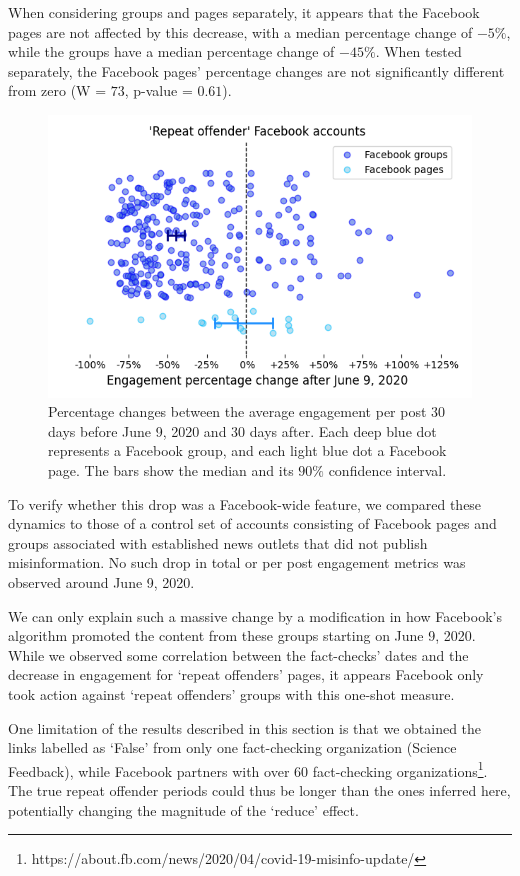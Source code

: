 \documentclass[11pt,a4paper]{article}
\begin{document}
When considering groups and pages separately, it appears that the Facebook pages are not affected by this decrease, with a median percentage change of $-5\%$, while the groups have a median percentage change of $-45\%$. 
When tested separately, the Facebook pages' percentage changes are not significantly different from zero (W = $73$, p-value = $0.61$).

\begin{figure}[!h]
\centering
\includegraphics[width=\linewidth]{./../figure/repeat_june_drop_percentage_change.png}
\caption{Percentage changes between the average engagement per post 30 days before June 9, 2020 and 30 days after. 
Each deep blue dot represents a Facebook group, and each light blue dot a Facebook page.
The bars show the median and its $90\%$ confidence interval.}
\label{repeat_june_drop_percentage_change}
\end{figure}

To verify whether this drop was a Facebook-wide feature, we compared these dynamics to those of a control set of accounts consisting of Facebook pages and groups associated with established news outlets that did not publish misinformation.
No such drop in total or per post engagement metrics was observed around June 9, 2020.

We can only explain such a massive change by a modification in how Facebook’s algorithm promoted the content from these groups starting on June 9, 2020.
While we observed some correlation between the fact-checks' dates and the decrease in engagement for `repeat offenders' pages, it appears Facebook only took action against `repeat offenders' groups with this one-shot measure.

One limitation of the results described in this section is that we obtained the links labelled as `False' from only one fact-checking organization (Science Feedback), while Facebook partners with over 60 fact-checking organizations\footnote{https://about.fb.com/news/2020/04/covid-19-misinfo-update/}.
The true repeat offender periods could thus be longer than the ones inferred here, potentially changing the magnitude of the ‘reduce’ effect.
\end{document}
